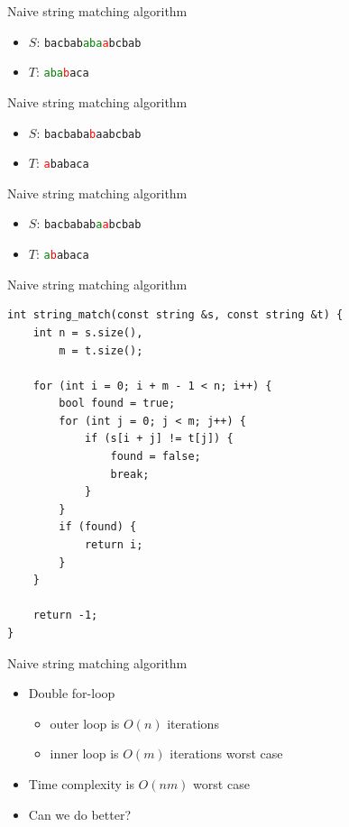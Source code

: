 \documentclass{beamer}
\begin{document}
\begin{frame}[plain]{Naive string matching algorithm}
    \begin{itemize}
        \item $S$: \texttt{bacbab\textcolor{green}{aba}\textcolor{red}{a}bcbab}
        \item $T$: \texttt{\textcolor{green}{aba}\textcolor{red}{b}aca}
    \end{itemize}
\end{frame}
\begin{frame}[plain]{Naive string matching algorithm}
    \begin{itemize}
        \item $S$: \texttt{bacbaba\textcolor{red}{b}aabcbab}
        \item $T$: \texttt{\textcolor{red}{a}babaca}
    \end{itemize}
\end{frame}
\begin{frame}[plain]{Naive string matching algorithm}
    \begin{itemize}
        \item $S$: \texttt{bacbabab\textcolor{green}{a}\textcolor{red}{a}bcbab}
        \item $T$: \texttt{\textcolor{green}{a}\textcolor{red}{b}abaca}
    \end{itemize}
\end{frame}

\begin{frame}{Naive string matching algorithm}
    \begin{verbatim}
int string_match(const string &s, const string &t) {
    int n = s.size(),
        m = t.size();

    for (int i = 0; i + m - 1 < n; i++) {
        bool found = true;
        for (int j = 0; j < m; j++) {
            if (s[i + j] != t[j]) {
                found = false;
                break;
            }
        }
        if (found) {
            return i;
        }
    }

    return -1;
}
    \end{verbatim}
\end{frame}

\begin{frame}[plain]{Naive string matching algorithm}
    \begin{itemize}
        \item Double for-loop
            \begin{itemize}
                \item outer loop is $O(n)$ iterations
                \item inner loop is $O(m)$ iterations worst case
            \end{itemize}
        \item Time complexity is $O(nm)$ worst case
        \item<2-> Can we do better?
    \end{itemize}
\end{frame}
\end{document}
